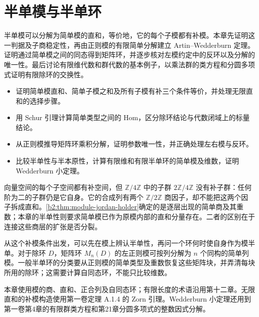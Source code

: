 
\chapter{半单模与半单环}
\label{b2:ch:13}

\begin{chapterabstract}
	半单模可以分解为简单模的直和，等价地，它的每个子模都有补模。本章先证明这一判据及子商稳定性，再由正则模的有限简单分解建立 Artin–Wedderburn 定理。证明通过简单模之间的同态得到矩阵环，并逐步核对左模约定中的反环以及分解的唯一性。最后讨论有限维代数和群代数的基本例子，以乘法群的类方程和分圆多项式证明有限除环的交换性。
\end{chapterabstract}

\begin{learninggoals}
	\begin{itemize}
		\item 证明简单模直和、简单子模之和及所有子模有补三个条件等价，并处理无限直和的选择步骤。
		\item 用 Schur 引理计算简单类型之间的 Hom，区分除环结论与代数闭域上的标量结论。
		\item 从正则模推导矩阵环乘积分解，证明参数唯一性，并正确处理左右模与反环。
		\item 比较半单性与半本原性，计算有限维和有限半单环的简单模及维数，证明 Wedderburn 小定理。
	\end{itemize}
\end{learninggoals}

向量空间的每个子空间都有补空间，但 \(\mathbb Z/4\mathbb Z\) 中的子群 \(2\mathbb Z/4\mathbb Z\) 没有补子群：任何阶为二的子群仍是它自身。它的合成列有两个 \(\mathbb Z/2\mathbb Z\) 商因子，却不能把这两个因子拆成直和。\cref{b2:thm:module-jordan-holder}确定的是逐层出现的简单商及其重数；本章的半单性则要求简单模已作为原模内部的直和分量存在。二者的区别在于连接这些商层的扩张是否分裂。

\ProseParagraphBreak

从这个补模条件出发，可以先在模上辨认半单性，再问一个环何时使自身作为模半单。对于除环 \(D\)，矩阵环 \(M_n(D)\) 的左正则模可按列分解为 \(n\) 个同构的简单列模。一般半单环的分类要从正则模的简单类型及重数恢复这些矩阵块，并弄清每块所用的除环；这需要计算自同态环，不能只比较维数。

\ProseParagraphBreak

本章使用模的商、直和、正合列及自同态环；有限长度的术语沿用第十二章。无限直和的补模构造使用第一卷定理 A.1.4 的 Zorn 引理。Wedderburn 小定理还用到第一卷第4章的有限群类方程和第21章分圆多项式的整数因式分解。

